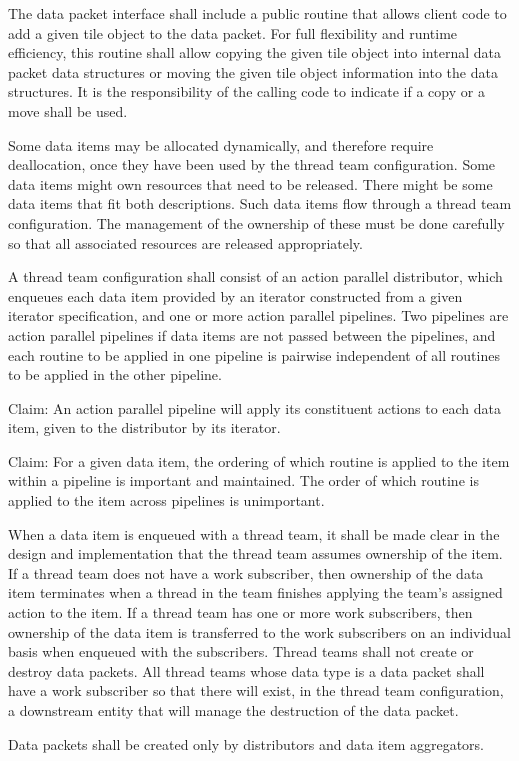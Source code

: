 \documentclass{article}
\begin{document}
\begin{spec}
The data packet interface shall include a public routine that allows client code
to add a given tile object to the data packet.  For full flexibility
and runtime efficiency, this routine shall allow copying the given tile
object into internal data packet data structures or moving the given tile object
information into the data structures.  It is the responsibility of the calling
code to indicate if a copy or a move shall be used.
\end{spec}

Some data items may be allocated dynamically, and therefore require deallocation,
once they have been used by the thread team configuration.  Some data items
might own resources that need to be released.  There might be some
data items that fit both descriptions.  Such data items flow through
a thread team configuration. The management of the ownership of these must be
done carefully so that all associated resources are released appropriately.

\begin{spec}
A thread team configuration shall consist of an action parallel distributor,
which enqueues each data item provided by an iterator constructed from a given
iterator specification, and one or more action parallel pipelines.  Two
pipelines are action parallel pipelines if data items are not passed between the
pipelines, and each routine to be applied in one pipeline is pairwise independent
of all routines to be applied in the other pipeline.
\end{spec}

Claim: An action parallel pipeline will apply its constituent actions to each
data item, given to the distributor by its iterator.

Claim: For a given data item, the ordering of which routine is applied to the
item within a pipeline is important and maintained.  The order of which
routine is applied to the item across pipelines is unimportant.

\begin{spec}
When a data item is enqueued with a thread team, it shall be made clear in the
design and implementation that the thread team assumes ownership of the item.
If a thread team does not have a work subscriber, then ownership of the data
item terminates when a thread in the team finishes applying the team's assigned
action to the item.  If a thread team has one or more work subscribers, then
ownership of the data item is transferred to the work subscribers on an
individual basis when enqueued with the subscribers.  Thread teams shall not
create or destroy data packets. All thread teams whose data type is
a data packet shall have a work subscriber so that there will exist, in the
thread team configuration, a downstream entity that will manage the destruction
of the data packet.
\end{spec}
Data packets shall be created only by distributors and data item aggregators.
\end{document}

